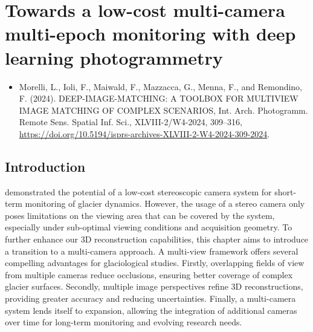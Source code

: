 \graphicspath{{figures/chapter5/}}
\onehalfspacing

\chapter{Towards a low-cost multi-camera multi-epoch monitoring with deep learning photogrammetry}\label{ch:5}

\vfill


\begin{itemize}
  \item Morelli, L., Ioli, F., Maiwald, F., Mazzacca, G., Menna, F., and Remondino, F. (2024). DEEP-IMAGE-MATCHING: A TOOLBOX FOR MULTIVIEW IMAGE MATCHING OF COMPLEX SCENARIOS, Int. Arch. Photogramm. Remote Sens. Spatial Inf. Sci., XLVIII-2/W4-2024, 309–316, \url{https://doi.org/10.5194/isprs-archives-XLVIII-2-W4-2024-309-2024}. 
\end{itemize}

\newpage

\section{Introduction}\label{sec:5:intro}


 demonstrated the potential of a low-cost stereoscopic camera system for short-term monitoring of glacier dynamics. 
However, the usage of a stereo camera only poses limitations on the viewing area that can be covered by the system, especially under sub-optimal viewing conditions and acquisition geometry.
To further enhance our 3D reconstruction capabilities, this chapter aims to introduce a transition to a multi-camera approach.  
A multi-view framework offers several compelling advantages for glaciological studies.  
Firstly, overlapping fields of view from multiple cameras reduce occlusions, ensuring better coverage of complex glacier surfaces. 
Secondly, multiple image perspectives refine 3D reconstructions, providing greater accuracy and reducing uncertainties. 
Finally, a multi-camera system lends itself to expansion, allowing the integration of additional cameras over time for long-term monitoring and evolving research needs.

